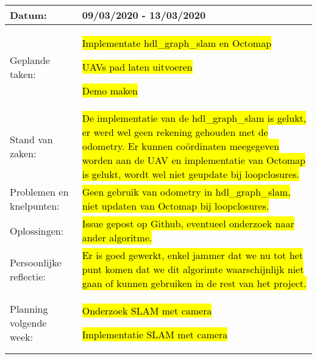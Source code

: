 \begin{tabularx}{\textwidth}{| l | X |}
  \hline
  Datum: & 09/03/2020 - 13/03/2020\\
  \hline
  Geplande taken: &
  \begin{compactitem}
    \item \hl{Implementate hdl\_graph\_slam en Octomap}
    \item \hl{UAVs pad laten uitvoeren}
    \item \hl{Demo maken}
  \end{compactitem}\\
  \hline
  Stand van zaken: & \hl{De implementatie van de hdl\_graph\_slam is gelukt, er werd wel geen rekening gehouden met de odometry. Er kunnen co\"ordinaten meegegeven worden aan de UAV en implementatie van Octomap is gelukt, wordt wel niet geupdate bij loopclosures.}\\
  \hline
  Problemen en knelpunten: & \hl{Geen gebruik van odometry in hdl\_graph\_slam, niet updaten van Octomap bij loopclosures.}\\
  \hline
  Oplossingen: & \hl{Issue gepost op Github, eventueel onderzoek naar ander algoritme.}\\
  \hline
  Persoonlijke reflectie: & \hl{Er is goed gewerkt, enkel jammer dat we nu tot het punt komen dat we dit algorimte waarschijnlijk niet gaan of kunnen gebruiken in de rest van het project.}\\
  \hline
  Planning volgende week: &
  \begin{compactitem}
    \item \hl{Onderzoek SLAM met camera}
    \item \hl{Implementatie SLAM met camera}
  \end{compactitem}\\
  \hline
\end{tabularx}